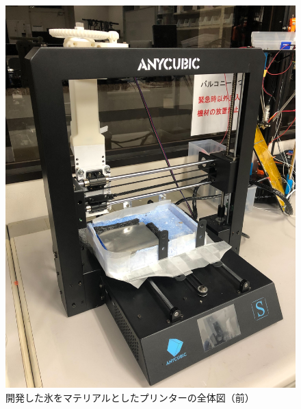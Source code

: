 \begin{figure}[H]
  \centering
  \includegraphics[width=7truecm]{./fig/printer.jpg}
  \caption{開発した氷をマテリアルとしたプリンターの全体図（前）}
  \label{fig:printer}
\end{figure}


